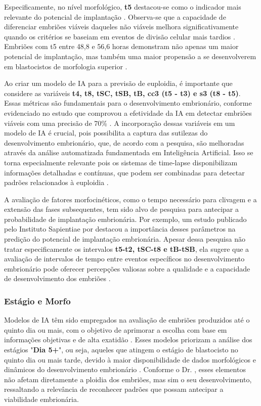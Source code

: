 Especificamente, no nível morfológico, \textbf{t5} destacou-se como o indicador mais relevante do potencial de implantação \cite{cruz2012}. Observa-se que a capacidade de diferenciar embriões viáveis daqueles não viáveis melhora significativamente quando os critérios se baseiam em eventos de divisão celular mais tardios \cite{cruz2012}. Embriões com t5 entre 48,8 e 56,6 horas demonstram não apenas um maior potencial de implantação, mas também uma maior propensão a se desenvolverem em blastocistos de morfologia superior \cite{cruz2012}.

Ao criar um modelo de IA para a previsão de euploidia, é importante que considere as variáveis \textbf{t4, t8, tSC, tSB, tB, cc3 (t5 - t3) e s3 (t8 - t5)}. Essas métricas são fundamentais para o desenvolvimento embrionário, conforme evidenciado no estudo que comprovou a efetividade da IA em detectar embriões viáveis com uma precisão de 70\% \cite{borges2019}. A incorporação dessas variáveis em um modelo de IA é crucial, pois possibilita a captura das sutilezas do desenvolvimento embrionário, que, de acordo com a pesquisa, são melhoradas através da análise automatizada fundamentada em Inteligência Artificial. Isso se torna especialmente relevante pois os sistemas de time-lapse disponibilizam informações detalhadas e contínuas, que podem ser combinadas para detectar padrões relacionados à euploidia \cite{borges2019}.

A avaliação de fatores morfocinéticos, como o tempo necessário para clivagem e a extensão das fases subsequentes, tem sido alvo de pesquisa para antecipar a probabilidade de implantação embrionária. Por exemplo, um estudo publicado pelo Instituto Sapientiae por  destacou a importância desses parâmetros na predição do potencial de implantação embrionária. Apesar dessa pesquisa não tratar especificamente os intervalos \textbf{t5-t2, tSC-t8 e tB-tSB}, ela sugere que a avaliação de intervalos de tempo entre eventos específicos no desenvolvimento embrionário pode oferecer percepções valiosas sobre a qualidade e a capacidade de desenvolvimento dos embriões \cite{borges2022}.

\subsubsection{Estágio e Morfo}
Modelos de IA têm sido empregados na avaliação de embriões produzidos até o quinto dia ou mais, com o objetivo de aprimorar a escolha com base em informações objetivas e de alta exatidão \cite{lassen2022}. Esses modelos priorizam a análise dos estágios "\textbf{Dia 5+}", ou seja, aqueles que atingem o estágio de blastocisto no quinto dia ou mais tarde, devido à maior disponibilidade de dados morfológicos e dinâmicos do desenvolvimento embrionário \cite{lassen2022}. Conforme o Dr. , esses elementos não afetam diretamente a ploidia dos embriões, mas sim o seu desenvolvimento, ressaltando a relevância de reconhecer padrões que possam antecipar a viabilidade embrionária.

